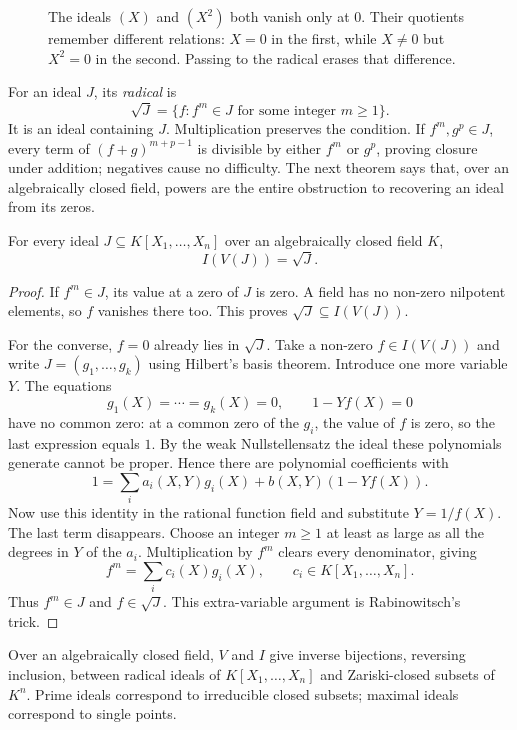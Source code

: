 \begin{figure}[ht]
\centering
{}
\caption{The ideals $(X)$ and $(X^2)$ both vanish only at $0$. Their quotients remember different relations: $X=0$ in the first, while $X\ne0$ but $X^2=0$ in the second. Passing to the radical erases that difference.}
\label{fig:v10new-ch04-multiplicity}
\end{figure}

For an ideal $J$, its \emph{radical} is
\[
\sqrt J=\{f:f^m\in J\text{ for some integer }m\ge1\}.
\]
It is an ideal containing $J$. Multiplication preserves the condition. If $f^m,g^p\in J$, every term of $(f+g)^{m+p-1}$ is divisible by either $f^m$ or $g^p$, proving closure under addition; negatives cause no difficulty. The next theorem says that, over an algebraically closed field, powers are the entire obstruction to recovering an ideal from its zeros.

\begin{theorem}\label{thm:nullstellensatz}
For every ideal $J\subseteq K[X_1,\ldots,X_n]$ over an algebraically closed field $K$,
\[
I(V(J))=\sqrt J.
\]
\end{theorem}

\begin{proof}
If $f^m\in J$, its value at a zero of $J$ is zero. A field has no non-zero nilpotent elements, so $f$ vanishes there too. This proves $\sqrt J\subseteq I(V(J))$.

For the converse, $f=0$ already lies in $\sqrt J$. Take a non-zero $f\in I(V(J))$ and write $J=(g_1,\ldots,g_k)$ using Hilbert's basis theorem. Introduce one more variable $Y$. The equations
\[
g_1(X)=\cdots=g_k(X)=0,\qquad 1-Yf(X)=0
\]
have no common zero: at a common zero of the $g_i$, the value of $f$ is zero, so the last expression equals $1$. By the weak Nullstellensatz the ideal these polynomials generate cannot be proper. Hence there are polynomial coefficients with
\[
1=\sum_i a_i(X,Y)g_i(X)+b(X,Y)(1-Yf(X)).
\]
Now use this identity in the rational function field and substitute $Y=1/f(X)$. The last term disappears. Choose an integer $m\ge1$ at least as large as all the degrees in $Y$ of the $a_i$. Multiplication by $f^m$ clears every denominator, giving
\[
f^m=\sum_i c_i(X)g_i(X),\qquad c_i\in K[X_1,\ldots,X_n].
\]
Thus $f^m\in J$ and $f\in\sqrt J$. This extra-variable argument is Rabinowitsch's trick.
\end{proof}

\begin{corollary}\label{cor:dictionary}
Over an algebraically closed field, $V$ and $I$ give inverse bijections, reversing inclusion, between radical ideals of $K[X_1,\ldots,X_n]$ and Zariski-closed subsets of $K^n$. Prime ideals correspond to irreducible closed subsets; maximal ideals correspond to single points.
\end{corollary}

